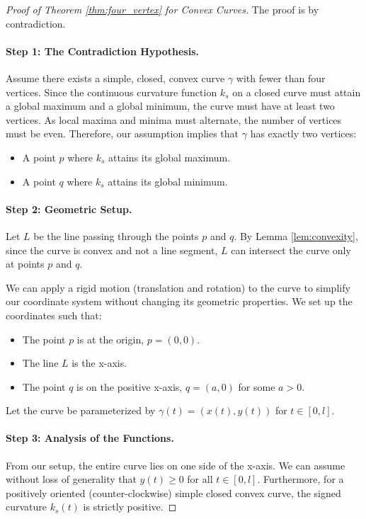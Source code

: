 \documentclass{article}
\begin{document}
\begin{proof}[Proof of Theorem \ref{thm:four_vertex} for Convex Curves]
The proof is by contradiction.

\paragraph{Step 1: The Contradiction Hypothesis.}
Assume there exists a simple, closed, convex curve $\gamma$ with fewer than four vertices. Since the continuous curvature function $k_s$ on a closed curve must attain a global maximum and a global minimum, the curve must have at least two vertices. As local maxima and minima must alternate, the number of vertices must be even. Therefore, our assumption implies that $\gamma$ has exactly two vertices:
\begin{itemize}
    \item A point $p$ where $k_s$ attains its global maximum.
    \item A point $q$ where $k_s$ attains its global minimum.
\end{itemize}

\paragraph{Step 2: Geometric Setup.}
Let $L$ be the line passing through the points $p$ and $q$. By Lemma \ref{lem:convexity}, since the curve is convex and not a line segment, $L$ can intersect the curve only at points $p$ and $q$.

We can apply a rigid motion (translation and rotation) to the curve to simplify our coordinate system without changing its geometric properties. We set up the coordinates such that:
\begin{itemize}
    \item The point $p$ is at the origin, $p=(0,0)$.
    \item The line $L$ is the x-axis.
    \item The point $q$ is on the positive x-axis, $q=(a,0)$ for some $a>0$.
\end{itemize}
Let the curve be parameterized by $\gamma(t) = (x(t), y(t))$ for $t \in [0, l]$.

\paragraph{Step 3: Analysis of the Functions.}
From our setup, the entire curve lies on one side of the x-axis. We can assume without loss of generality that $y(t) \ge 0$ for all $t \in [0,l]$.
Furthermore, for a positively oriented (counter-clockwise) simple closed convex curve, the signed curvature $k_s(t)$ is strictly positive.


\end{proof}
\end{document}
